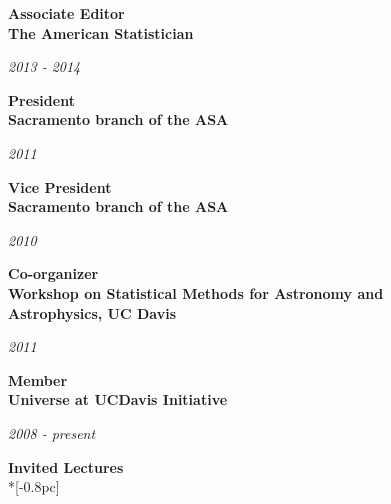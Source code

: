 \documentclass[11pt]{article}
\newcommand{\head}[1]{
  \vspace{10pt}
  {\Large \bf #1} \\*[-0.8pc]
  \underline{\hspace{6.07in}}}
\newcommand{\datedentry}[2]{
  \vspace{5pt}
  \begin{minipage}{5in}{\textbf{#1}}\end{minipage}
  \hfill
  \begin{minipage}{1in}{\hfill\textit{#2}}\end{minipage}
  }
\begin{document}
\vspace{7pt}


\datedentry{Associate Editor\\ The American Statistician}{2013 - 2014}

\vspace{7pt}

\datedentry{President\\ Sacramento branch of the ASA}{2011}

\vspace{7pt}

\datedentry{Vice President\\ Sacramento branch of the ASA}{2010}

\vspace{7pt}

\datedentry{Co-organizer\\  Workshop on Statistical Methods for Astronomy and\\ Astrophysics, UC Davis}{2011}

\vspace{7pt}

\datedentry{Member\\ Universe at UCDavis Initiative}{2008 - present}


\vspace{5pt}
\head{Invited Lectures}
\end{document}

